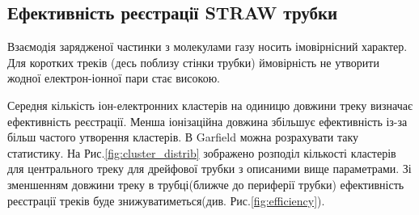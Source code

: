 \documentclass[pdftex,14pt]{scrartcl}
\begin{document}
\begin{spacing}{1.5}
	\subsection{Ефективність реєстрації STRAW трубки}
	
	Взаємодія зарядженої частинки з молекулами газу носить імовірнісний характер. Для коротких треків (десь поблизу стінки трубки) ймовірність не утворити жодної електрон-іонної пари стає високою.
	
	Середня кількість іон-електронних кластерів на одиницю довжини треку визначає ефективність реєстрації. \cite{kozlinskiy} Менша іонізаційна довжина збільшує ефективність із-за більш частого утворення кластерів. В Garfield можна розрахувати  таку статистику. На Рис.\ref{fig:cluster_distrib}  зображено розподіл кількості кластерів для центрального треку для дрейфової трубки з описаними вище параметрами. Зі зменшенням довжини треку в трубці(ближче до периферії трубки) ефективність реєстрації треків буде знижуватиметься(див. Рис.\ref{fig:efficiency}).
	
	
		
	


\end{spacing}
\end{document}
